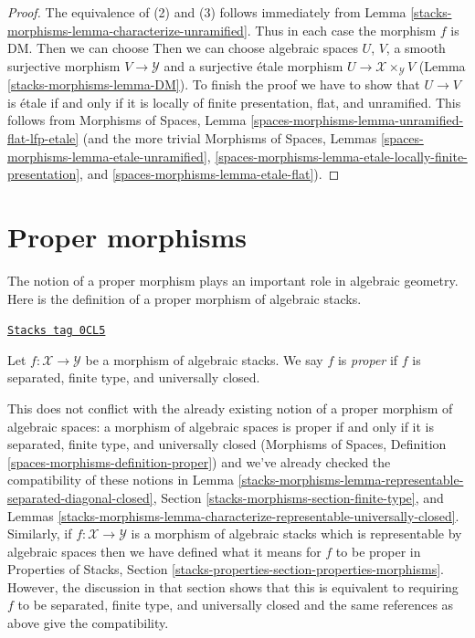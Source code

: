 \begin{proof}
The equivalence of (2) and (3) follows immediately from
Lemma \ref{stacks-morphisms-lemma-characterize-unramified}. Thus in each case
the morphism $f$ is DM. Then we can choose Then we can choose
algebraic spaces $U$, $V$, a smooth surjective morphism
$V \to \mathcal{Y}$ and a surjective \'etale morphism
$U \to \mathcal{X} \times_\mathcal{Y} V$ (Lemma \ref{stacks-morphisms-lemma-DM}).
To finish the proof we have to show that
$U \to V$ is \'etale if and only if it is locally of finite
presentation, flat, and unramified.
This follows from Morphisms of Spaces, Lemma
\ref{spaces-morphisms-lemma-unramified-flat-lfp-etale}
(and the more trivial
Morphisms of Spaces, Lemmas
\ref{spaces-morphisms-lemma-etale-unramified},
\ref{spaces-morphisms-lemma-etale-locally-finite-presentation}, and
\ref{spaces-morphisms-lemma-etale-flat}).
\end{proof}

\section{Proper morphisms}
\label{stacks-morphisms-section-proper}
The notion of a proper morphism plays an important role in algebraic geometry.
Here is the definition of a proper morphism of algebraic stacks.

\begin{definition}[Proper]
\label{stacks-morphisms-definition-proper}
\href{https://stacks.math.columbia.edu/tag/0CL5}{\texttt{Stacks tag 0CL5}}

Let $f : \mathcal{X} \to \mathcal{Y}$
be a morphism of algebraic stacks.
We say $f$ is {\it proper} if $f$ is separated, finite type, and
universally closed.
\end{definition}

This does not conflict with the already existing notion of a proper morphism
of algebraic spaces: a morphism of algebraic spaces is proper if and only if
it is separated, finite type, and universally closed
(Morphisms of Spaces, Definition \ref{spaces-morphisms-definition-proper})
and we've already checked the compatibility of these notions in
Lemma \ref{stacks-morphisms-lemma-representable-separated-diagonal-closed},
Section \ref{stacks-morphisms-section-finite-type}, and
Lemmas \ref{stacks-morphisms-lemma-characterize-representable-universally-closed}.
Similarly, if $f : \mathcal{X} \to \mathcal{Y}$ is a
morphism of algebraic stacks which is representable by algebraic spaces
then we have defined what it means for $f$ to be proper in
Properties of Stacks, Section
\ref{stacks-properties-section-properties-morphisms}.
However, the discussion in that section shows that this is
equivalent to requiring $f$ to be separated, finite type, and
universally closed and the same references as above give the
compatibility.

